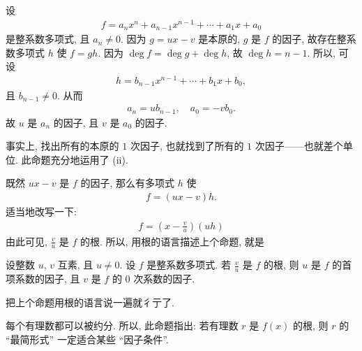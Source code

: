 \begin{pf}
    设
    \begin{align*}
        f = a_n x^n + a_{n-1} x^{n-1} + \cdots + a_1 x + a_0
    \end{align*}
    是整系数多项式, 且 $a_n \neq 0$. 因为 $g = ux - v$ 是本原的, $g$ 是 $f$ 的因子, 故存在整系数多项式 $h$ 使 $f = gh$. 因为 $\deg f = \deg g + \deg h$, 故 $\deg h = n - 1$. 所以, 可设
    \begin{align*}
        h = b_{n-1} x^{n-1} + \cdots + b_1 x + b_0,
    \end{align*}
    且 $b_{n-1} \neq 0$. 从而
    \begin{align*}
        a_n = ub_{n-1}, \quad a_0 = -vb_0.
    \end{align*}
    故 $u$ 是 $a_n$ 的因子, 且 $v$ 是 $a_0$ 的因子.
\end{pf}

\begin{remark}
    事实上, 找出所有的本原的 $1$ 次因子, 也就找到了所有的 $1$ 次因子——也就差个单位. 此命题充分地运用了 (ii).
\end{remark}

既然 $ux - v$ 是 $f$ 的因子, 那么有多项式 $h$ 使
\begin{align*}
    f = (ux - v) h.
\end{align*}
适当地改写一下:
\begin{align*}
    f = \left( x - \frac{v}{u} \right) (uh)
\end{align*}
由此可见, $\frac{v}{u}$ 是 $f$ 的根. 所以, 用根的语言描述上个命题, 就是
\begin{proposition}
    设整数 $u$, $v$ 互素, 且 $u \neq 0$. 设 $f$ 是整系数多项式. 若 $\frac{v}{u}$ 是 $f$ 的根, 则 $u$ 是 $f$ 的首项系数的因子, 且 $v$ 是 $f$ 的 $0$ 次系数的因子.
\end{proposition}

\begin{pf}
    把上个命题用根的语言说一遍就彳亍了.
\end{pf}

\begin{remark}
    每个有理数都可以被约分. 所以, 此命题指出: 若有理数 $r$ 是 $f(x)$ 的根, 则 $r$ 的 ``最简形式'' 一定适合某些 ``因子条件''.
\end{remark}

